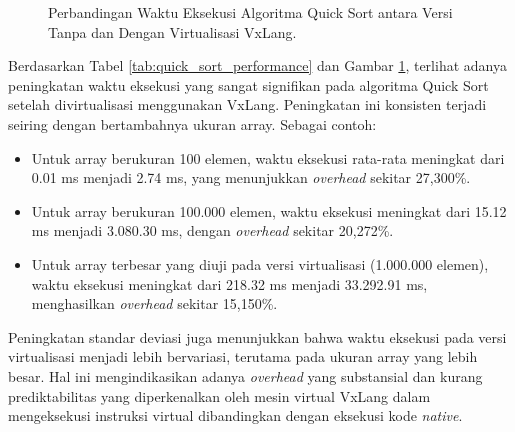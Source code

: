 \begin{figure}[H] %
    \centering
    \caption{Perbandingan Waktu Eksekusi Algoritma Quick Sort antara Versi Tanpa dan Dengan Virtualisasi VxLang.}
    \label{fig:quick_sort_performance}
\end{figure}

Berdasarkan Tabel \ref{tab:quick_sort_performance} dan Gambar \ref{fig:quick_sort_performance}, terlihat adanya peningkatan waktu eksekusi yang sangat signifikan pada algoritma Quick Sort setelah divirtualisasi menggunakan VxLang. Peningkatan ini konsisten terjadi seiring dengan bertambahnya ukuran array. Sebagai contoh:
\begin{itemize}
    \item Untuk array berukuran 100 elemen, waktu eksekusi rata-rata meningkat dari 0.01 ms menjadi 2.74 ms, yang menunjukkan \textit{overhead} sekitar 27,300\%.
    \item Untuk array berukuran 100.000 elemen, waktu eksekusi meningkat dari 15.12 ms menjadi 3.080.30 ms, dengan \textit{overhead} sekitar 20,272\%.
    \item Untuk array terbesar yang diuji pada versi virtualisasi (1.000.000 elemen), waktu eksekusi meningkat dari 218.32 ms menjadi 33.292.91 ms, menghasilkan \textit{overhead} sekitar 15,150\%.
\end{itemize}
Peningkatan standar deviasi juga menunjukkan bahwa waktu eksekusi pada versi virtualisasi menjadi lebih bervariasi, terutama pada ukuran array yang lebih besar. Hal ini mengindikasikan adanya \textit{overhead} yang substansial dan kurang prediktabilitas yang diperkenalkan oleh mesin virtual VxLang dalam mengeksekusi instruksi virtual dibandingkan dengan eksekusi kode \textit{native}. 

